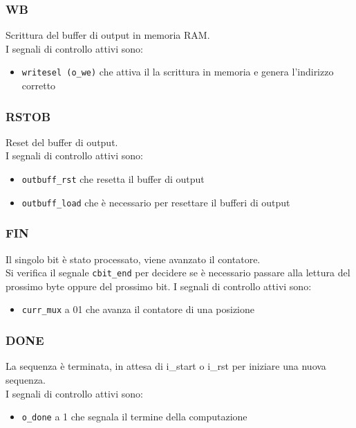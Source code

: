 \documentclass[12pt, a4paper]{article}
\begin{document}
\subsubsection{WB}
Scrittura del buffer di output in memoria RAM.\\
I segnali di controllo attivi sono:
\begin{itemize}
    \item \texttt{writesel (o\_we)} che attiva il la scrittura in memoria e genera l'indirizzo corretto
\end{itemize}

\subsubsection{RSTOB}
Reset del buffer di output.\\
I segnali di controllo attivi sono:
\begin{itemize}
    \item \texttt{outbuff\_rst} che resetta il buffer di output
    \item \texttt{outbuff\_load} che è necessario per resettare il bufferi di output
\end{itemize}

\subsubsection{FIN}
Il singolo bit è stato processato, viene avanzato il contatore.\\
Si verifica il segnale \texttt{cbit\_end} per decidere se è necessario passare alla lettura del
prossimo byte oppure del prossimo bit.
I segnali di controllo attivi sono:
\begin{itemize}
    \item \texttt{curr\_mux} a 01 che avanza il contatore di una posizione
\end{itemize}

\subsubsection{DONE}
La sequenza è terminata, in attesa di i\_start o i\_rst per iniziare una nuova sequenza.\\
I segnali di controllo attivi sono:
\begin{itemize}
    \item \texttt{o\_done} a 1 che segnala il termine della computazione
\end{itemize}
\end{document}
